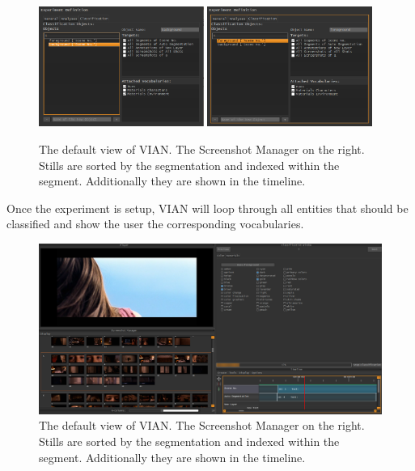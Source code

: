 \documentclass[11pt, a4paper,oneside,chapterprefix=false]{scrbook}
\begin{document}
\begin{figure}[htp]
	\centering
	\includegraphics[width=0.48\textwidth]{figures/vian_exp_bg.png}
	\hfill
	\includegraphics[width=0.48\textwidth]{figures/vian_exp_fg.png}
	\caption{The default view of VIAN. The Screenshot Manager on the right. Stills are sorted by the segmentation and indexed within the segment. Additionally they are shown in the timeline. }
	\label{fig:vian_classobj}
\end{figure}

\newpage
Once the experiment is setup, VIAN will loop through all entities that should be classified and show the user the corresponding vocabularies. 

\begin{figure}[htp]
	\centering
	\includegraphics[width=1.0\textwidth]{figures/classification.PNG}
	\caption{The default view of VIAN. The Screenshot Manager on the right. Stills are sorted by the segmentation and indexed within the segment. Additionally they are shown in the timeline. }
	\label{fig:vian_classobj}
\end{figure}
\end{document}
